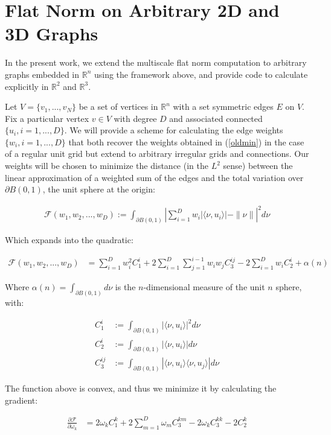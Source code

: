 \documentclass[12pt]{article}
\begin{document}
\section{Flat Norm on Arbitrary 2D and 3D Graphs}

In the present work, we extend the multiscale flat norm computation to arbitrary graphs embedded in $\mathbb{R}^n$ using the framework above, and provide code to calculate explicitly in $\mathbb{R}^2$ and $\mathbb{R}^3$.

Let $V = \{v_1,...,v_N\}$ be a set of vertices in $\mathbb{R}^n$ with a set symmetric edges $E$ on $V$. Fix a particular vertex $v \in V$ with degree $D$ and associated connected $\{u_i, i = 1,...,D\}$. We will provide a scheme for calculating the edge weights $\{w_i, i = 1,...,D\}$ that both recover the weights obtained in (\ref{oldmin}) in the case of a regular unit grid but extend to arbitrary irregular grids and connections. Our weights will be chosen to minimize the distance (in the $L^2$ sense) between the linear approximation of a weighted sum of the edges and the total variation over $\partial B(0,1)$, the unit sphere at the origin:

\begin{align*}
\mathcal{F}(w_1,w_2,...,w_D) := \int_{\partial B(0,1)} \left|\sum_{i=1}^D w_i |\langle \nu, u_i \rangle| - \| \nu \| \right|^2d\nu
\end{align*}

Which expands into the quadratic:

\begin{align*}
\mathcal{F}(w_1,w_2,...,w_D) &= \sum_{i=1}^D w_i^2C_1^i + 2 \sum_{i=1}^D \sum_{j=1}^{i-1} w_i w_j C_3^{ij} - 2 \sum_{i=1}^D w_i C_2^i + \alpha(n)
\end{align*}

Where $\alpha(n) = \int_{\partial B(0,1)}d\nu$ is the $n$-dimensional measure of the unit $n$ sphere, with:

\begin{align*}
C_1^i &:= \int_{\partial B(0,1)} |\langle \nu,u_i \rangle|^2 d\nu\\
C_2^i &:= \int_{\partial B(0,1)} |\langle \nu,u_i \rangle| d\nu\\
C_3^{ij} &:= \int_{\partial B(0,1)} |\langle \nu,u_i \rangle \langle \nu, u_j \rangle| d\nu
\end{align*}

The function above is convex, and thus we minimize it by calculating the gradient:

\begin{align*}
	\frac{\partial \mathcal{F}}{\partial \omega_k}  &= 2 \omega_k C_1^k + 2 \sum_{m=1}^{D}\omega_{m}C_{3}^{km} - 2\omega_kC_3^{kk} - 2 C_2^k\\
\end{align*}
\end{document}
